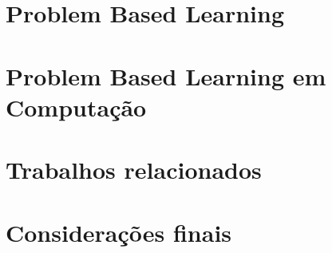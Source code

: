 \acresetall
\section{Problem Based Learning}
\section{Problem Based Learning em Computação}
\section{Trabalhos relacionados}
\section{Considerações finais}
